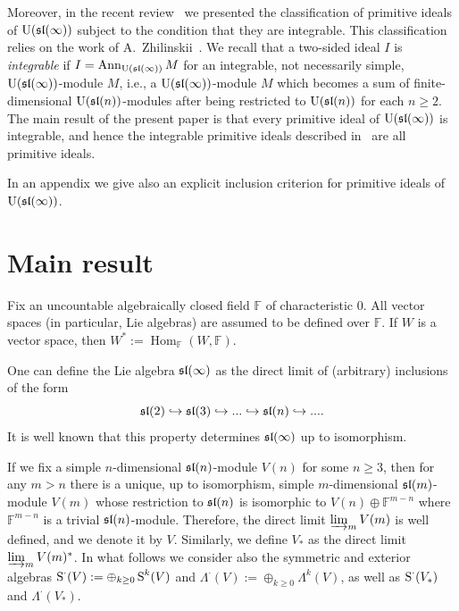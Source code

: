 \documentclass[10pt]{amsart}\oddsidemargin -1mm \evensidemargin -1mm \topmargin -15mm\headheight5mm \headsep 3.5mm \textheight 245mm\textwidth 170mm %
\begin{document}
Moreover, in the recent review~\cite{PP3} we presented the classification of primitive ideals of $\operatorname{\mathrm{U}}(\frak{sl}(\infty))$ subject to the condition that they are integrable. This classification relies on the work of A.~Zhilinskii~\cite{Zh1, Zh2, Zh3}. We recall that a two-sided ideal $I$ is {\it integrable} if  $I=\operatorname{\mathrm{Ann}}_{\operatorname{\mathrm{U}}(\frak{sl}(\infty))}M$ for an integrable, not necessarily simple,  $\operatorname{\mathrm{U}}(\frak{sl}(\infty))$-module $M$, i.e., a $\operatorname{\mathrm{U}}(\frak{sl}(\infty))$-module $M$ which becomes a sum of finite-dimensional $\operatorname{\mathrm{U}}(\frak{sl}(n))$-modules after being restricted to $\operatorname{\mathrm{U}}(\frak{sl}(n))$ for each $n\ge2$. The main result of the present paper is that every primitive ideal of $\operatorname{\mathrm{U}}(\frak{sl}(\infty))$ is integrable, and hence the integrable primitive ideals described in~\cite{PP3} are all primitive ideals.

In an appendix we give also an explicit inclusion criterion for primitive ideals of ${\rm U}(\frak{sl}(\infty))$.
\section{Main result}\label{Smr} Fix an uncountable algebraically closed field $\mathbb F$ of characteristic 0. All vector spaces (in particular, Lie algebras) are assumed to be defined over $\mathbb F$. If $W$ is a vector space, then $W^*:=\operatorname{Hom}_{\mathbb F}(W, \mathbb F)$.

One can define the Lie algebra $\frak{sl}(\infty)$ as the direct limit of (arbitrary) inclusions of the form
$$\frak{sl}(2)\hookrightarrow\frak{sl}(3)\hookrightarrow...\hookrightarrow\frak{sl}(n)\hookrightarrow....$$
It is well known that this property determines $\frak{sl}(\infty)$ up to isomorphism. 

If we fix a simple $n$-dimensional $\frak{sl}(n)$-module $V(n)$ for some $n\ge3$, then for any $m>n$ there is a unique, up to isomorphism, simple $m$-dimensional $\frak{sl}(m)$-module $V(m)$ whose restriction to $\frak{sl}(n)$ is isomorphic to $V(n)\oplus\mathbb F^{m-n}$ where $\mathbb F^{m-n}$ is a trivial $\frak{sl}(n)$-module. Therefore, the direct limit $\varinjlim_{m} V(m)$ is well defined, and we denote it by $V$. Similarly, we define $V_*$ as the direct limit $\varinjlim_{m} V(m)^*$. 
In what follows we consider also the symmetric and exterior algebras $\operatorname{\mathrm{S}}^\cdot(V):=\oplus_{k\ge0}\operatorname{\mathrm{S}}^k(V)$ and $\Lambda^\cdot(V):=\oplus_{k\ge0}\Lambda^k(V)$, as well as $\operatorname{\mathrm{S}}^\cdot(V_*)$ and $\Lambda^\cdot(V_*)$.
\end{document}
